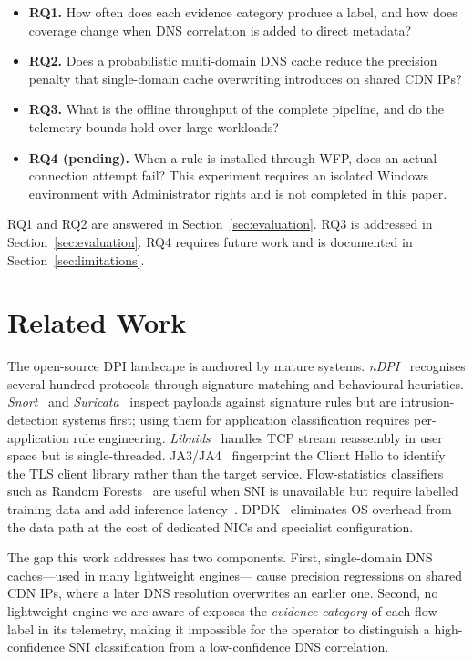 \documentclass[conference]{IEEEtran}
\begin{document}
\begin{itemize}
\item \textbf{RQ1.} How often does each evidence category produce a label,
and how does coverage change when DNS correlation is added to direct
metadata?
\item \textbf{RQ2.} Does a probabilistic multi-domain DNS cache
reduce the precision penalty that single-domain cache overwriting
introduces on shared CDN IPs?
\item \textbf{RQ3.} What is the offline throughput of the complete
pipeline, and do the telemetry bounds hold over large workloads?
\item \textbf{RQ4 (pending).} When a rule is installed through WFP,
does an actual connection attempt fail?  This experiment requires an
isolated Windows environment with Administrator rights and is not
completed in this paper.
\end{itemize}

RQ1 and RQ2 are answered in Section~\ref{sec:evaluation}.
RQ3 is addressed in Section~\ref{sec:evaluation}.
RQ4 requires future work and is documented in
Section~\ref{sec:limitations}.

\section{Related Work}

The open-source DPI landscape is anchored by mature systems.
\textit{nDPI}~\cite{ndpi} recognises several hundred protocols through
signature matching and behavioural heuristics.
\textit{Snort}~\cite{snort} and \textit{Suricata}~\cite{suricata}
inspect payloads against signature rules but are intrusion-detection
systems first; using them for application classification requires
per-application rule engineering.
\textit{Libnids}~\cite{libnids} handles TCP stream reassembly in user
space but is single-threaded.
JA3/JA4~\cite{ja3} fingerprint the Client Hello to identify the
TLS client library rather than the target service.
Flow-statistics classifiers such as Random Forests~\cite{rf} are useful
when SNI is unavailable but require labelled training data and add
inference latency~\cite{kim2010}.
DPDK~\cite{dpdk} eliminates OS overhead from the data path at
the cost of dedicated NICs and specialist configuration.

The gap this work addresses has two components.
First, single-domain DNS caches---used in many lightweight engines---
cause precision regressions on shared CDN IPs, where a later DNS
resolution overwrites an earlier one.
Second, no lightweight engine we are aware of exposes the
\emph{evidence category} of each flow label in its telemetry, making
it impossible for the operator to distinguish a high-confidence SNI
classification from a low-confidence DNS correlation.
\end{document}
